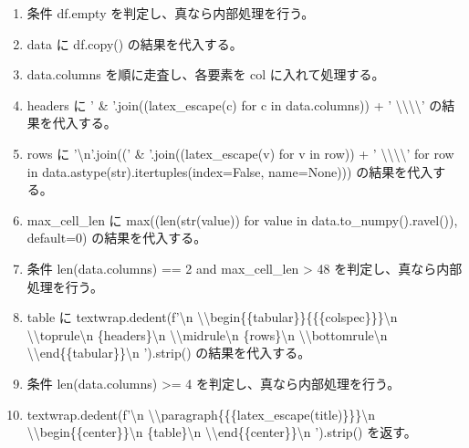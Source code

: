 \documentclass[a4paper,11pt]{article}
\begin{document}
            \begin{enumerate}[leftmargin=1.8em]
            \item 条件 df.empty を判定し、真なら内部処理を行う。
\item data に df.copy() の結果を代入する。
\item data.columns を順に走査し、各要素を col に入れて処理する。
\item headers に ' \& '.join((latex\_escape(c) for c in data.columns)) + ' \textbackslash{}\textbackslash{}\textbackslash{}\textbackslash{}' の結果を代入する。
\item rows に '\textbackslash{}n'.join((' \& '.join((latex\_escape(v) for v in row)) + ' \textbackslash{}\textbackslash{}\textbackslash{}\textbackslash{}' for row in data.astype(str).itertuples(index=False, name=None))) の結果を代入する。
\item max\_cell\_len に max((len(str(value)) for value in data.to\_numpy().ravel()), default=0) の結果を代入する。
\item 条件 len(data.columns) == 2 and max\_cell\_len > 48 を判定し、真なら内部処理を行う。
\item table に textwrap.dedent(f'\textbackslash{}n        \textbackslash{}\textbackslash{}begin\{\{tabular\}\}\{\{\{colspec\}\}\}\textbackslash{}n        \textbackslash{}\textbackslash{}toprule\textbackslash{}n        \{headers\}\textbackslash{}n        \textbackslash{}\textbackslash{}midrule\textbackslash{}n        \{rows\}\textbackslash{}n        \textbackslash{}\textbackslash{}bottomrule\textbackslash{}n        \textbackslash{}\textbackslash{}end\{\{tabular\}\}\textbackslash{}n        ').strip() の結果を代入する。
\item 条件 len(data.columns) >= 4 を判定し、真なら内部処理を行う。
\item textwrap.dedent(f'\textbackslash{}n        \textbackslash{}\textbackslash{}paragraph\{\{\{latex\_escape(title)\}\}\}\textbackslash{}n        \textbackslash{}\textbackslash{}begin\{\{center\}\}\textbackslash{}n        \{table\}\textbackslash{}n        \textbackslash{}\textbackslash{}end\{\{center\}\}\textbackslash{}n        ').strip() を返す。
            \end{enumerate}
\end{document}
